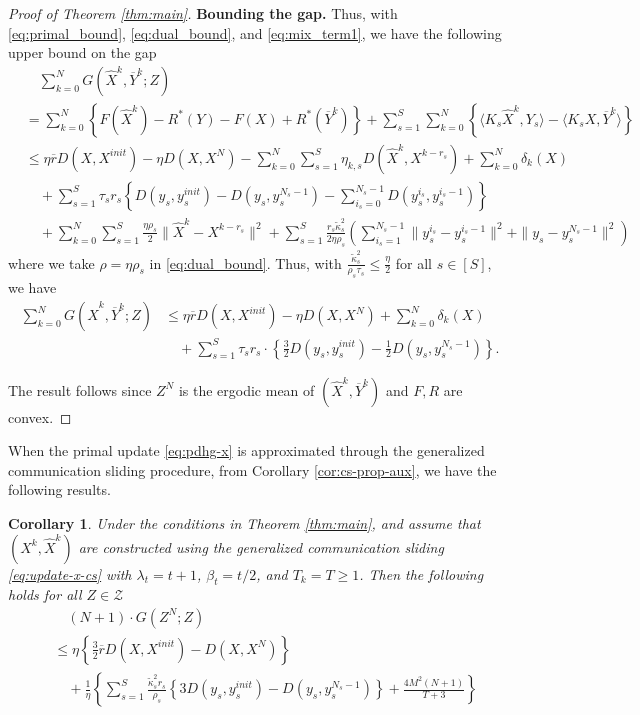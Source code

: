 \documentclass[10pt]{article}
\newcommand{\mc}{\mathcal}
\newtheorem{corollary}{Corollary}[section]
\begin{document}
\begin{proof}[Proof of Theorem \ref{thm:main}]
\textbf{Bounding the gap.}
Thus, with \eqref{eq:primal_bound}, \eqref{eq:dual_bound}, and \eqref{eq:mix_term1}, we have the following upper bound on the gap 
\begin{align*}
    &\quad \sum_{k=0}^N G(\widehat{X}^k,\overline{Y}^k;Z)\\
    &=\sum_{k=0}^N \left\{F(\widehat{X}^k) -R^*(Y)- F(X) + R^*(\overline{Y}^k)\right\} + \sum_{s=1}^S \sum_{k=0}^N\left\{\langle K_{s}\widehat{X}^k,Y_s\rangle - \langle K_sX,\overline{Y}^k\rangle\right\}\\
     &\leq \eta \overline{r}D(X,X^{init})- \eta  D(X,X^{N})-\sum_{k=0}^N\sum_{s=1}^S  \eta_{k,s} D(\widehat{X}^k,X^{k-r_s})+ \sum_{k=0}^N \delta_k(X)\\
    &\quad +  \sum_{s=1}^S \tau_{s}r_s\left\{D(y_s,y_s^{init}) - D(y_s,y_s^{N_s-1})-\sum_{i_s=0}^{N_s-1} D(y^{i_s}_s,y_s^{i_s-1})\right\}\\
    &\quad + \sum_{k=0}^{N} \sum_{s=1}^S\frac{\eta\rho_s}{2}\|\widehat{X}^{k}-X^{k-r_s}\|^2 + \sum_{s=1}^S\frac{r_s\widetilde{\kappa}^2_{s}}{2\eta\rho_s}(\sum_{i_s=1}^{N_s-1}\|y_s^{i_s}-y_s^{i_s-1}\|^2 +  \|y_s-y_s^{N_s-1}\|^2)
\end{align*}
where we take $\rho = \eta \rho_s$ in \eqref{eq:dual_bound}. Thus, with $\frac{\widetilde{\kappa}^2_{s}}{\rho_s\tau_s}\leq \frac{\eta}{2}$ for all $s\in [S]$, we have
\begin{align*}
    \sum_{k=0}^{N} G(\widehat{X}^k,\overline{Y}^k;Z)&\leq \eta\overline{r}D(X,X^{init}) - \eta  D(X,X^{N}) +\sum_{k=0}^N \delta_k(X)\\
    &\quad +  \sum_{s=1}^S \tau_{s}r_s\cdot\left\{\frac{3}{2}D(y_s,y_s^{init}) - \frac{1}{2}D(y_s,y_s^{N_s-1})\right\}.
\end{align*}

The result follows since $Z^N $ is the ergodic mean of $(\widehat{X}^k,\overline{Y}^k)$ and $F,R$ are convex.
\end{proof}





When the primal update \eqref{eq:pdhg-x} is approximated through the generalized communication sliding procedure, from Corollary \ref{cor:cs-prop-aux}, we have the following results. 
\begin{corollary}\label{cor:main-cs}
Under the conditions in Theorem \ref{thm:main}, and assume that $(X^k,\widehat{X}^k)$ are constructed using the generalized communication sliding \eqref{eq:update-x-cs} with $\lambda_t = t+1$, $\beta_t = t/2$, and $T_k = T\geq 1$. Then the following holds for all $Z\in \mc Z$ 
\begin{align*}
    &\quad (N+1) \cdot G(Z^N;Z)\\
     &\leq \eta\left\{\frac{3}{2}\overline{r}D(X,X^{init}) -  D(X,X^{N})\right\}\\
    &\quad + \frac{1}{\eta}\left\{ \sum_{s=1}^S \frac{\widetilde{\kappa}_s^2r_s}{\rho_s}\left\{3D(y_s,y_s^{init}) - D(y_s,y_s^{N_s-1})\right\} + \frac{4M^2(N+1)}{T+3}\right\}
\end{align*}
    
\end{corollary}
\end{document}
